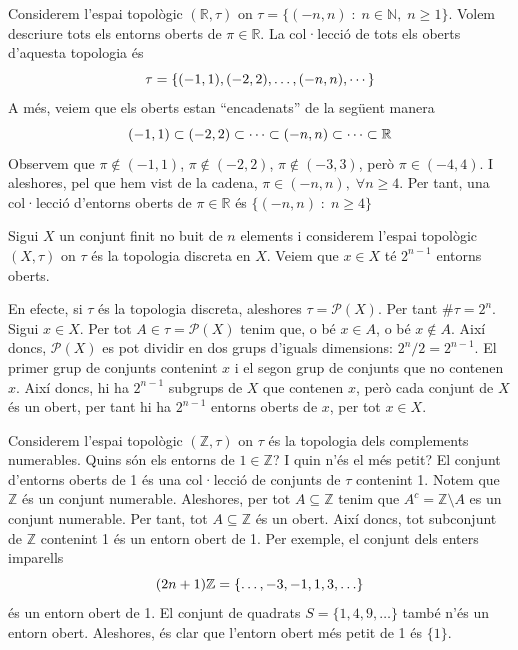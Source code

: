 \documentclass[../main.tex]{subfiles}
\begin{document}
\begin{ej}
\label{ej:entorn3} Considerem l'espai topològic $(\mathbb{R},\tau)$ on $\tau = \{(-n,n)\;:\;n\in\mathbb{N},\;n\geq 1\}$. Volem descriure tots els entorns oberts de $\pi\in\mathbb{R}$. La col·lecció de tots els oberts d'aquesta topologia és
\begin{equation}
    \notag
    \tau = \{(-1,1),(-2,2),\ldots,(-n,n),\cdots\}
\end{equation}
A més, veiem que els oberts estan ``encadenats'' de la següent manera
\begin{equation}
    \notag
    (-1,1)\subset(-2,2)\subset\cdots\subset(-n,n)\subset\cdots\subset\mathbb{R}
\end{equation}
Observem que $\pi\not\in(-1,1)$, $\pi\not\in(-2,2)$, $\pi\not\in(-3,3)$, però $\pi\in(-4,4)$. I aleshores, pel que hem vist de la cadena, $\pi\in(-n,n),\;\forall n\geq 4$. Per tant, una col·lecció d'entorns oberts de $\pi\in\mathbb{R}$ és $\{(-n,n)\;:\;n\geq 4\}$
\end{ej}

\begin{ej}
\label{ej:entorn4} Sigui $X$ un conjunt finit no buit de $n$ elements i considerem l'espai topològic $(X,\tau)$ on $\tau$ és la topologia discreta en $X$. Veiem que $x\in X$ té $2^{n-1}$ entorns oberts.

En efecte, si $\tau$ és la topologia discreta, aleshores $\tau = \mathscr{P}(X)$. Per tant $\#\tau = 2^n$. Sigui $x\in X$. Per tot $A\in\tau=\mathscr{P}(X)$ tenim que, o bé $x\in A$, o bé $x\not\in A$. Així doncs, $\mathscr{P}(X)$ es pot dividir en dos grups d'iguals dimensions: $2^n/2 = 2^{n-1}$. El primer grup de conjunts contenint $x$ i el segon grup de conjunts que no contenen $x$. Així doncs, hi ha $2^{n-1}$ subgrups de $X$ que contenen $x$, però cada conjunt de $X$ és un obert, per tant hi ha $2^{n-1}$ entorns oberts de $x$, per tot $x\in X$.
\end{ej}

\begin{ej}
\label{ej:entorn5} Considerem l'espai topològic $(\mathbb{Z},\tau)$ on $\tau$ és la topologia dels complements numerables. Quins són els entorns de $1\in\mathbb{Z}$? I quin n'és el més petit? El conjunt d'entorns oberts de 1 és una col·lecció de conjunts de $\tau$ contenint 1. Notem que $\mathbb{Z}$ és un conjunt numerable. Aleshores, per tot $A\subseteq\mathbb{Z}$ tenim que $A^c = \mathbb{Z}\setminus A$ es un conjunt numerable. Per tant, tot $A\subseteq \mathbb{Z}$ és un obert. Així doncs, tot subconjunt de $\mathbb{Z}$ contenint 1 és un entorn obert de 1. Per exemple, el conjunt dels enters imparells
\begin{equation}
    \notag
    (2n+1)\mathbb{Z} = \{\ldots,-3,-1,1,3,\ldots\}
\end{equation}
és un entorn obert de 1. El conjunt de quadrats $S =\{1,4,9,\ldots\}$ també n'és un entorn obert. Aleshores, és clar que l'entorn obert més petit de 1 és $\{1\}$.
\end{ej}
\end{document}

